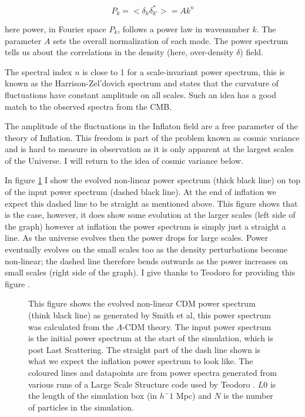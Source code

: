 \begin{equation}
P_k = < \delta_k \delta_{k'}^* > = A k^{n}
\end{equation}

\noindent here power, in Fourier space $P_k$, follows a power law in wavenumber $k$. The parameter $A$ sets the overall normalization of each mode. The power spectrum tells us about the correlations in the density (here, over-density $\delta$) field.

The spectral index $n$ is close to 1 for a scale-invariant power spectrum, this is known as the Harrison-Zel'dovich spectrum \citep{bib_harrison, bib_zeld} and states that the curvature of fluctuations have constant amplitude on all scales. Such an idea has a good match to the observed spectra from the CMB. \citep{bib_baum}

The amplitude of the fluctuations in the Inflaton field are a free parameter of the theory of Inflation. This freedom is part of the problem known as cosmic variance and is hard to measure in observation as it is only apparent at the largest scales of the Universe. I will return to the idea of cosmic variance below.

In figure \ref{fig.cdmpower} I show the evolved non-linear power spectrum (thick black line) on top of the input power spectrum (dashed black line). At the end of inflation we expect this dashed line to be straight as mentioned above. This figure shows that is the case, however, it does show some evolution at the larger scales (left side of the graph) however at inflation the power spectrum is simply just a straight a line. As the universe evolves then the power drops for large scales. Power eventually evolves on the small scales too as the density perturbations become non-linear; the dashed line therefore bends outwards as the power increases on small scales (right side of the graph). I give thanks to Teodoro for providing this figure \citep{bib_teodoro}.

\begin{figure}[htb]
   \begin{center}
     \leavevmode
                \epsfxsize=145mm

   \end{center}
\caption{This figure shows the evolved non-linear CDM power spectrum (think black line) as generated by Smith et al, this power spectrum was calculated from the $\Lambda$-CDM theory. The input power spectrum is the initial power spectrum at the start of the simulation, which is post Last Scattering. The straight part of the dash line shown is what we expect the inflation power spectrum to look like. The coloured lines and datapoints are from power spectra generated from various runs of a Large Scale Structure code used by Teodoro \citep{bib_teodoro}. $L0$ is the length of the simulation box (in $h^-1$ Mpc) and $N$ is the number of particles in the simulation.}
\label{fig.cdmpower}
\end{figure}


